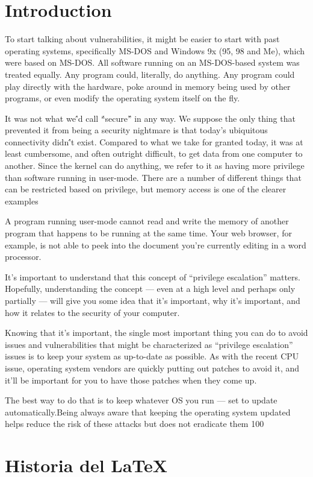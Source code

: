 \documentclass[letterpaper, 10pt, journal]{IEEEtran}
\begin{document}
\section{Introduction}
To start talking about vulnerabilities, it might be easier to start with past operating systems, specifically MS-DOS and Windows 9x (95, 98 and Me), which were based on MS-DOS.
All software running on an MS-DOS-based system was treated equally. Any program could, literally, do anything. Any program could play directly with the hardware, poke around in memory being used by other programs, or even modify the operating system itself on the fly.

It was not what we\'’d call \'“secure\'” in any way. We suppose the only thing that prevented it from being a security nightmare is that today’s ubiquitous connectivity didn\'’t exist. Compared to what we take for granted today, it was at least cumbersome, and often outright difficult, to get data from one computer to another. Since the kernel can do anything, we refer to it as having more privilege than software running in user-mode. There are a number of different things that can be restricted based on privilege, but memory access is one of the clearer examples

A program running user-mode cannot read and write the memory of another program that happens to be running at the same time. Your web browser, for example, is not able to peek into the document you’re currently editing in a word processor.

It’s important to understand that this concept of “privilege escalation” matters. Hopefully, understanding the concept — even at a high level and perhaps only partially — will give you some idea that it’s important, why it’s important, and how it relates to the security of your computer.

Knowing that it’s important, the single most important thing you can do to avoid issues and vulnerabilities that might be characterized as “privilege escalation” issues is to keep your system as up-to-date as possible. As with the recent CPU issue, operating system vendors are quickly putting out patches to avoid it, and it’ll be important for you to have those patches when they come up.

The best way to do that is to keep whatever OS you run — set to update automatically.Being always aware that keeping the operating system updated helps reduce the risk of these attacks but does not eradicate them 100%

\section{Historia del \LaTeX  }
\end{document}
